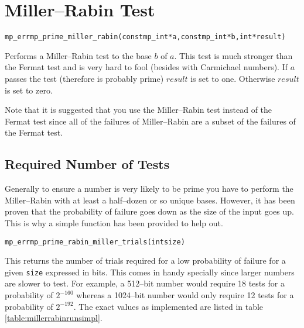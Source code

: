 \documentclass[synpaper]{book}
\begin{document}
\section{Miller--Rabin Test}
\begin{alltt}
mp_err mp_prime_miller_rabin (const mp_int *a, const mp_int *b, int *result)
\end{alltt}
Performs a Miller--Rabin test to the base $b$ of $a$.  This test is much stronger than the Fermat
test and is very hard to fool (besides with Carmichael numbers).  If $a$ passes the test (therefore
is probably prime) $result$ is set to one. Otherwise $result$ is set to zero.

Note that it is suggested that you use the Miller--Rabin test instead of the Fermat test since all
of the failures of Miller--Rabin are a subset of the failures of the Fermat test.

\subsection{Required Number of Tests}
Generally to ensure a number is very likely to be prime you have to perform the Miller--Rabin with
at least a half--dozen or so unique bases.  However, it has been proven that the probability of
failure goes down as the size of the input goes up. This is why a simple function has been provided
to help out.

\begin{alltt}
mp_err mp_prime_rabin_miller_trials(int size)
\end{alltt}
This returns the number of trials required for a low probability of failure for a given
\texttt{size} expressed in bits.  This comes in handy specially since larger numbers are slower to
test. For example, a 512--bit number would require 18 tests for a probability of $2^{-160}$ whereas
a 1024--bit number would only require 12 tests for a probability of $2^{-192}$. The exact values as
implemented are listed in table \ref{table:millerrabinrunsimpl}.
\end{document}
